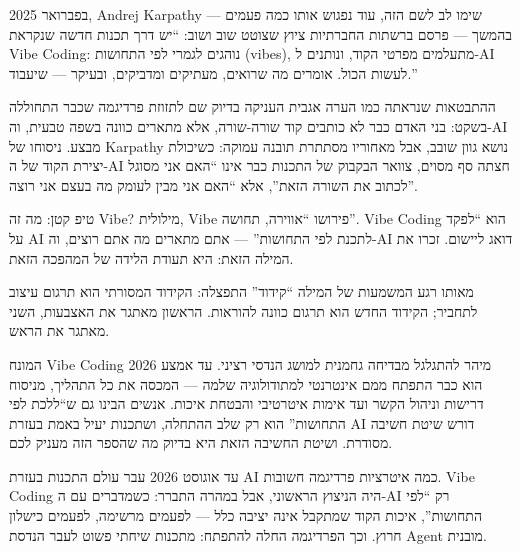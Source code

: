 


בפברואר 2025, Andrej Karpathy — שימו לב לשם הזה, עוד נפגוש אותו כמה פעמים בהמשך — פרסם ברשתות החברתיות ציוץ שצוטט שוב ושוב: “יש דרך תכנות חדשה שנקראת Vibe Coding: נוהגים לגמרי לפי התחושות (vibes), מתעלמים מפרטי הקוד, ונותנים ל-AI לעשות הכול. אומרים מה שרואים, מעתיקים ומדביקים, ובעיקר — שיעבוד.”

ההתבטאות שנראתה כמו הערה אגבית העניקה בדיוק שם לתזוזת פרדיגמה שכבר התחוללה בשקט: בני האדם כבר לא כותבים קוד שורה-שורה, אלא מתארים כוונה בשפה טבעית, וה-AI מבצע. ניסוחו של Karpathy נושא גוון שובב, אבל מאחוריו מסתתרת תובנה עמוקה: כשיכולת יצירת הקוד של ה-AI חצתה סף מסוים, צוואר הבקבוק של התכנות כבר אינו “האם אני מסוגל לכתוב את השורה הזאת”, אלא “האם אני מבין לעומק מה בעצם אני רוצה”.

\begin{tcbinfo}{טיפ קטן: מה זה Vibe?}
מילולית, Vibe פירושו “אווירה, תחושה”. Vibe Coding הוא “לפקד על AI לתכנת לפי התחושות” — אתם מתארים מה אתם רוצים, וה-AI דואג ליישום. זכרו את המילה הזאת: היא תעודת הלידה של המהפכה הזאת.

\end{tcbinfo}

מאותו רגע המשמעות של המילה “קידוד” התפצלה: הקידוד המסורתי הוא תרגום עיצוב לתחביר; הקידוד החדש הוא תרגום כוונה להוראות. הראשון מאתגר את האצבעות, השני מאתגר את הראש.

המונח Vibe Coding מיהר להתגלגל מבדיחה גחמנית למושג הנדסי רציני. עד אמצע 2026 הוא כבר התפתח ממם אינטרנטי למתודולוגיה שלמה — המכסה את כל התהליך, מניסוח דרישות וניהול הקשר ועד אימות איטרטיבי והבטחת איכות. אנשים הבינו גם ש“ללכת לפי התחושות” הוא רק שלב ההתחלה, ושתכנות יעיל באמת בעזרת AI דורש שיטת חשיבה מסודרת. ושיטת החשיבה הזאת היא בדיוק מה שהספר הזה מעניק לכם.


עד אוגוסט 2026 עבר עולם התכנות בעזרת AI כמה איטרציות פרדיגמה חשובות. Vibe Coding היה הניצוץ הראשוני, אבל במהרה התברר: כשמדברים עם ה-AI רק “לפי התחושות”, איכות הקוד שמתקבל אינה יציבה כלל — לפעמים מרשימה, לפעמים כישלון חרוץ. וכך הפרדיגמה החלה להתפתח: מתכנות שיחתי פשוט לעבר הנדסת Agent מובנית.


